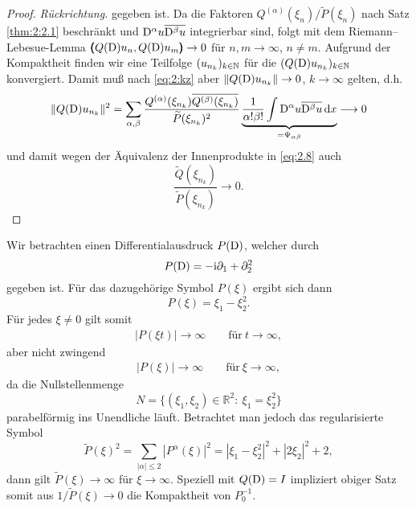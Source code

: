 \begin{proof} {\it Rückrichtung.}
gegeben ist. Da die Faktoren $Q^{(\alpha)}(\xi_n)/\widetilde{P}(\xi_n)$ nach Satz \ref{thm:2:2.1} beschränkt und $\mathrm D^\alpha u\overline{\mathrm D^\beta u}$ integrierbar sind, folgt mit dem Riemann--Lebesue-Lemma $\pmb(Q(\mathrm D)u_n,Q(\mathrm D)u_m\pmb)\to0$ für $n,m\to\infty$, $n\neq m$. Aufgrund der Kompaktheit finden wir eine Teilfolge $(u_{n_k})_{k\in\mathbb N}$ für die $(Q(\mathrm D)u_{n_k})_{k \in \mathbb{N}}$ konvergiert. Damit muß nach \eqref{eq:2:kz}  aber $\|Q(\mathrm D)u_{n_k}\|\to0$, $k\to\infty$ gelten, d.h.
\begin{equation}
\lVert Q(\mathrm D)u_{n_k}\rVert^2=\sum_{\alpha,\beta}\frac{Q^{(\alpha)}(\xi_{n_k}) \overline{Q^{(\beta)}(\xi_{n_k})}}{\widetilde{P}(\xi_{n_k})^2} \underbrace{\frac{1}{\alpha! \beta!}\int \mathrm D^{\alpha} u \overline{\mathrm D^{\beta} u} \,\mathrm d x}_{=\Psi_{\alpha \beta}} \longrightarrow 0
\end{equation}
und damit wegen der Äquivalenz der Innenprodukte in \eqref{eq:2.8} auch 
\begin{equation}
\frac{\widetilde{Q}(\xi_{n_k})}{\widetilde{P}(\xi_{n_k})} \longrightarrow 0.
\end{equation}
\end{proof}
\begin{exa}
Wir betrachten einen Differentialausdruck $P(\mathrm D)$, welcher durch
\begin{equation}
P(\mathrm D) = -\mathrm i\partial_1 + \partial_2^2
\end{equation}
gegeben ist. Für das dazugehörige Symbol $P(\xi)$ ergibt sich dann
\begin{equation}
P(\xi) = \xi_1 - \xi_2^2.
\end{equation}
Für jedes $\xi \not = 0$ gilt somit
\begin{align}
|P(\xi t)| \rightarrow \infty \qquad \text{für} \ t \rightarrow \infty,
\end{align}
aber nicht zwingend
\begin{align}
|P(\xi)| \rightarrow \infty \qquad \text{für} \ \xi \rightarrow \infty,
\end{align}
da die Nullstellenmenge
\begin{equation}
N= \{ (\xi_1,\xi_2)\in \mathbb{R}^2 : \ \xi_1 = \xi_2^2 \}
\end{equation}
parabelförmig ins Unendliche läuft. Betrachtet man jedoch das regularisierte Symbol
\begin{equation}
\widetilde{P}(\xi)^2 = \sum_{|\alpha| \leq 2} |P^{\alpha}(\xi)|^2 = |\xi_1 - \xi_2^2|^2 + |2\xi_2|^2 + 2,
\end{equation}
dann gilt $\widetilde{P}(\xi) \rightarrow \infty$ für $\xi \rightarrow \infty$. Speziell mit $Q(\mathrm D)=I$ impliziert obiger Satz somit aus
$1/\widetilde P(\xi)\to0$ die Kompaktheit von $P_0^{-1}$.
\end{exa}
